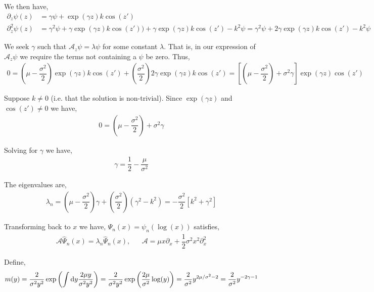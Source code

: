 \begin{solution}[Solution]
We then have,
\begin{align*}
    \partial_z \psi(z) &= \gamma \psi + \exp(\gamma z) k \cos(z') \\
    \partial_z^2 \psi(z) &= \gamma^2 \psi + \gamma \exp(\gamma z) k \cos(z'))
    + \gamma \exp(\gamma z) k \cos(z') - k^2\psi
    = \gamma^2 \psi + 2 \gamma \exp(\gamma z) k \cos(z') - k^2\psi
\end{align*}

We seek \( \gamma \) such that \( \mathcal{A}_z \psi = \lambda \psi \) for some constant \( \lambda \). That is, in our expression of \( \mathcal{A}_z\psi \) we require the terms not containing a \( \psi \) be zero.
Thus,
\begin{align*}
    0 = \left( \mu - \dfrac{\sigma^2}{2} \right) \exp(\gamma z) k \cos(z') + \left( \dfrac{\sigma^2}{2} \right)2\gamma\exp(\gamma z) k \cos(z') 
    = \left[ \left( \mu - \dfrac{\sigma^2}{2} \right) + \sigma^2 \gamma \right]\exp(\gamma z)\cos(z')
\end{align*}

Suppose \( k\neq 0 \) (i.e. that the solution is non-trivial). Since \( \exp(\gamma z) \) and \( \cos(z')\neq 0 \) we have,
\begin{align*}
    0 = \left( \mu - \dfrac{\sigma^2}{2} \right) + \sigma^2\gamma
\end{align*}

Solving for \( \gamma \) we have,
\begin{align*}
    \gamma = \dfrac{1}{2} - \dfrac{\mu}{\sigma^2}
\end{align*}

The eigenvalues are,
\begin{align*}
    \lambda_n
    = \left( \mu - \dfrac{\sigma^2}{2} \right)\gamma + \left( \dfrac{\sigma^2}{2} \right) \left( \gamma^2 - k^2 \right) = -\dfrac{\sigma^2}{2}[k^2+\gamma^2]
\end{align*}
\iffalse
=-\frac{\pi ^2 n^2 \sigma ^2}{2 (\log (l)-\log (r))^2}-\frac{\left(\sigma ^2-2 \mu \right)^2}{8 \sigma ^2}
    = - \dfrac{\sigma^2}{2}[k^2+\gamma^2]
\fi

Transforming back to \( x \) we have, \( \hat{\Psi}_n(x) = \psi_n(\log(x))  \) satisfies,
\begin{align*}
    \mathcal{A} \hat{\Psi}_n(x) = \lambda_n \hat{\Psi}_n(x), && \mathcal{A}  = \mu x \partial_x + \dfrac{1}{2}\sigma^2 x^2 \partial_x^2
\end{align*}

Define,
\begin{align*}
    m(y) = \dfrac{2}{\sigma^2 y^2} \exp \left( \int\mathrm{d} y \dfrac{2 \mu y}{\sigma^2y^2}\right) 
    = \dfrac{2}{\sigma^2y^2}\exp \left( \dfrac{2\mu}{\sigma^2} \log(y) \right) 
    = \dfrac{2}{\sigma^2} y^{2\mu/\sigma^2-2}
    = \dfrac{2}{\sigma^2} y^{-2\gamma-1}
\end{align*}


\end{solution}
